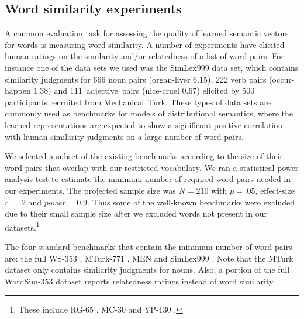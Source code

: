 \subsection{Word similarity experiments}
\label{sec:experiments-wsj}
A common evaluation task for assessing the quality of learned semantic
vectors for words is measuring word similarity. A number of
experiments have elicited human ratings on the similarity and/or
relatedness of a list of word pairs. For instance one of the data sets
we used was the SimLex999 data set, which contains similarity judgments
for 666 noun pairs (organ-liver 6.15), 222 verb pairs (occur-happen 1.38)
and \mbox{111 adjective pairs} (nice-cruel 0.67) elicited by 500 participants
recruited from \mbox{Mechanical Turk}\label{rev:similarity_example}.
These types of data sets are commonly used as
benchmarks for models of distributional semantics, where the learned
representations are expected to show a significant positive
correlation with human similarity judgments on a large number of word
pairs.


We selected a subset of the existing benchmarks according to the size
of their word pairs that overlap with our restricted vocabulary. We
ran a statistical power analysis test to estimate the minimum number
of required word pairs needed in our experiments. The projected sample
size was $N=210$ with $p=.05$, effect-size $r=.2$ and
$\mathit{power}=0.9$.  Thus some of the well-known benchmarks were
excluded due to their small sample size after we excluded words not
present in our datasets.\footnote{These include RG-65
  \cite{rubenstein1965contextual}, MC-30 \cite{miller1991contextual}
  and YP-130 \cite{yang2006verb}.}


The four standard benchmarks that contain the minimum number of word
pairs are: the full WS-353 \cite{wordsim353}, MTurk-771
\cite{radinsky2011word}, MEN \cite{bruni2014multimodal} and
SimLex999 \cite{hill2014simlex}. Note that the MTurk dataset only
contains similarity judgments for nouns. Also, a portion of the full
WordSim-353 dataset reports relatedness ratings instead of word
similarity.

